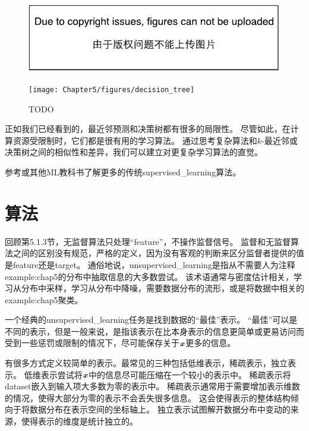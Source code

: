 \begin{figure}[!htb]
\ifOpenSource
\centerline{\includegraphics{figure.pdf}}
\else
\centerline{\texttt{[image: Chapter5/figures/decision\_tree]}}
\fi
\caption{TODO}
\label{fig:chap5_decision_tree}
\end{figure}

正如我们已经看到的，最近邻预测和决策树都有很多的局限性。
尽管如此，在计算资源受限制时，它们都是很有用的学习算法。
通过思考复杂算法和$k$-最近邻或决策树之间的相似性和差异，我们可以建立对更复杂学习算法的直觉。

参考\cite{MurphyBook2012,bishop-book2006,Hastie2001}或其他\gls{ML}教科书了解更多的传统\gls{supervised_learning}算法。

\section{算法}
\label{sec:unsupervised_learning_algorithms}
回顾第5.1.3节，无监督算法只处理``\gls{feature}''，不操作监督信号。
监督和无监督算法之间的区别没有规范，严格的定义，因为没有客观的判断来区分监督者提供的值是\gls{feature}还是\gls{target}。
通俗地说，\gls{unsupervised_learning}是指从不需要人为注释\gls{example:chap5}的分布中抽取信息的大多数尝试。
该术语通常与密度估计相关，学习从分布中采样，学习从分布中降噪，需要数据分布的流形，或是将数据中相关的\gls{example:chap5}聚类。

一个经典的\gls{unsupervised_learning}任务是找到数据的``最佳''表示。
``最佳''可以是不同的表示，但是一般来说，是指该表示在比本身表示的信息更简单或更易访问而受到一些惩罚或限制的情况下，尽可能保存关于$\boldsymbol{\mathit{x}}$更多的信息。 


有很多方式定义较简单的表示。最常见的三种包括低维表示，稀疏表示，独立表示。
低维表示尝试将$\boldsymbol{\mathit{x}}$中的信息尽可能压缩在一个较小的表示中。
稀疏表示将\gls{dataset}嵌入到输入项大多数为零的表示中\citep{Barlow89,Olshausen+Field-1996,Hinton+Ghahramani-97}。
稀疏表示通常用于需要增加表示维数的情况，使得大部分为零的表示不会丢失很多信息。
这会使得表示的整体结构倾向于将数据分布在表示空间的坐标轴上。
独立表示试图解开数据分布中变动的来源，使得表示的维度是统计独立的。

